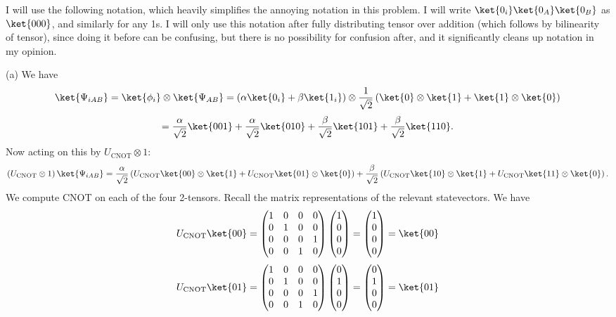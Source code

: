 \documentclass[11pt, letterpaper]{article}
\begin{document}
I will use the following notation, which heavily simplifies the annoying notation in this problem. I will write $\ket{0_i}\ket{0_A}\ket{0_B}$ as $\ket{000}$, and similarly for any 1s. I will only use this notation after fully distributing tensor over addition (which follows by bilinearity of tensor), since doing it before can be confusing, but there is no possibility for confusion after, and it significantly cleans up notation in my opinion.

(a) We have
\[
	\ket{\Psi _{iAB} }=\ket{\phi _i}\otimes \ket{\Psi _{AB} }=\left( \alpha \ket{0_i}+ \beta \ket{1_i}\right) \otimes \frac{1}{\sqrt{2} } \left( \ket{0}\otimes \ket{1}+\ket{1}\otimes \ket{0} \right) 
\]
\[
	=\frac{\alpha }{\sqrt{2} } \ket{001}+\frac{\alpha }{\sqrt{2} } \ket{010}+\frac{\beta }{\sqrt{2} } \ket{101}+\frac{\beta }{\sqrt{2} } \ket{110}
.\]
Now acting on this by $U_{\mathrm{CNOT} } \otimes 1$:
\[
	\left( U_{\mathrm{CNOT} } \otimes 1 \right) \ket{\Psi _{iAB} }=\frac{\alpha }{\sqrt{2} } \left( U_{\mathrm{CNOT} } \ket{00}\otimes \ket{1} + U_{\mathrm{CNOT} } \ket{01}\otimes \ket{0} \right) +\frac{\beta }{\sqrt{2}} \left( U_{\mathrm{CNOT} } \ket{10}\otimes \ket{1}+U_{\mathrm{CNOT} } \ket{11}\otimes \ket{0} \right) 
.\]
We compute CNOT on each of the four 2-tensors. Recall the matrix representations of the relevant statevectors. We have
\[
	U_{\mathrm{CNOT} } \ket{00}=\begin{pmatrix}
	1 & 0 & 0 & 0 \\
	0 & 1 & 0 & 0 \\
	0 & 0 & 0 & 1 \\
	0 & 0 & 1 & 0
	\end{pmatrix}\begin{pmatrix}
	1 \\
	0 \\
	0 \\
	0
	\end{pmatrix}=\begin{pmatrix}
	1 \\
	0 \\
	0 \\
	0
\end{pmatrix}=\ket{00}
\]
\[
	U_{\mathrm{CNOT} } \ket{01}=\begin{pmatrix}
	1 & 0 & 0 & 0 \\
	0 & 1 & 0 & 0 \\
	0 & 0 & 0 & 1 \\
	0 & 0 & 1 & 0
	\end{pmatrix}\begin{pmatrix}
	0 \\
	1 \\
	0 \\
	0
	\end{pmatrix}=\begin{pmatrix}
	0 \\
	1 \\
	0 \\
	0
\end{pmatrix}=\ket{01}
\]
\end{document}
